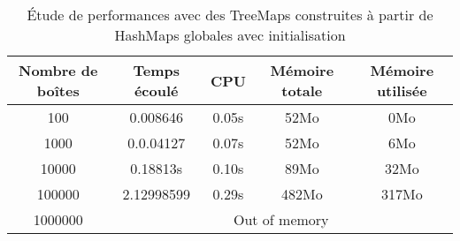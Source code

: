 \begin{table}[h]
  \centering
\begin{tabular}{|c|c|c|c|c|}
\hline
Nombre de boîtes & Temps écoulé & CPU & Mémoire totale & Mémoire utilisée\\
\hline
100 & 0.008646 & 0.05s & 52Mo & 0Mo\\
\hline
1000 & 0.0.04127 & 0.07s & 52Mo & 6Mo\\
\hline
10000 & 0.18813s & 0.10s & 89Mo & 32Mo\\
\hline
100000 & 2.12998599 & 0.29s & 482Mo & 317Mo\\
\hline
1000000 & \multicolumn{4}{|c|}{Out of memory}\\
\hline
\end{tabular}
\caption{Étude de performances avec des TreeMaps construites à partir de HashMaps globales avec initialisation} 
\label{tab:treehashmapglobalInit}
\end{table}
